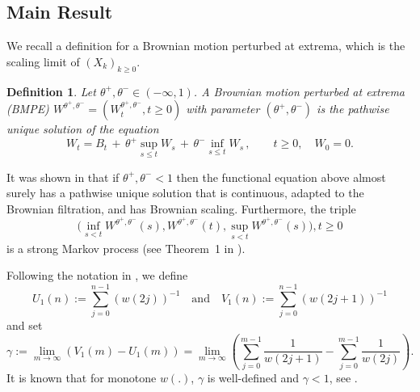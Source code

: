 \documentclass[twoside,12pt, a4paper]{article}
\newtheorem{definition}{Definition}[section]
\numberwithin{equation}{section}
\theoremstyle{remark}
\newcommand{\comment}[1]{\textcolor{blue}{(Comment: #1)}}
\begin{document}
	
	
	
	
	\subsection{Main Result}
	We recall a definition for a Brownian motion perturbed at extrema, which is the scaling limit of $(X_k)_{k\geq 0}$.
	\begin{definition}
		\label{defn:BMPE}
		Let $\theta^+, \theta^- \in (- \infty , 1)$. A Brownian motion perturbed at
		extrema (BMPE) $W^{\theta^+, \theta^-} = \left(W^{\theta^+, \theta^-}_t, t\geq 0\right)$ with parameter $(\theta^+, \theta^-)$ is the pathwise unique solution of the equation
		$$
		W_t = B_t \,+\, \theta^+ \sup_{s\leq t} W_s  \,+\, \theta^- \inf_{s\leq t} W_s \,,   \qquad t \ge 0, \quad W_0 = 0.
		$$
	\end{definition}
	It was shown in \cite{PW97, CD99} that if $\theta^+, \theta^- < 1$ then the functional equation above almost surely has a pathwise unique solution that is continuous, adapted to the Brownian filtration, and has Brownian scaling. 
	Furthermore, the triple 
	$${\big(\inf_{s < t} W^{\theta^{+}, \theta^{-}}(s), 
		W^{\theta^{+}, \theta^{-}}(t) , 
		\sup _{s<t} W^{\theta^{+}, \theta^{-}}(s)\big)}, t \geq 0$$ is a strong Markov process (see Theorem~1 in \cite{PW97}).
	
	Following the notation in \cite{T96}, we define
	\[
	U_1(n):=\sum_{j=0}^{n-1}(w(2 j))^{-1} \quad \text{and} \quad
	V_1(n):=\sum_{j=0}^{n-1}(w(2 j+1))^{-1}
	\]
	and set
	\begin{equation}
		\label{eq: gamma}
		\gamma:= \lim_{m\to \infty}\left( V_1(m) - U_1(m) \right) =\lim_{m\to \infty} \left( \sum_{j=0}^{m-1} \frac{1}{ w(2j+1)}-  \sum_{j=0}^{m-1}  \frac{1}{w(2j)} \right) 
		.\end{equation}
	It is known that for monotone $w(.)$, $\gamma$
	is well-defined and ${\gamma<1}$, see \cite{T96}. 
	
\end{document}
